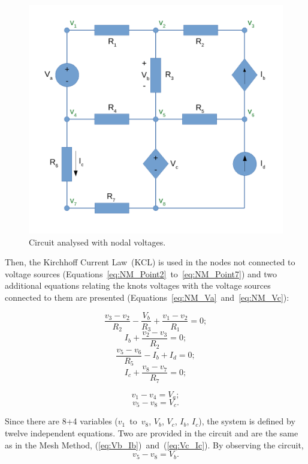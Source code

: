 \begin{figure}[h] \centering
\includegraphics[width=0.5\linewidth]{CircuitNodal.pdf}
\caption{Circuit analysed with nodal voltages.}
\label{fig:Circuit_Nodal}
\end{figure}

Then, the Kirchhoff Current Law~(KCL) is used in the nodes not connected to voltage sources (Equations~\ref{eq:NM_Point2}~to~\ref{eq:NM_Point7}) and two additional equations relating the knots voltages with the voltage sources connected to them are presented (Equations~\ref{eq:NM_Va}~and~\ref{eq:NM_Vc}):

\begin{equation}
  \frac{v_3-v_2}{R_2} - \frac{V_b}{R_3} + \frac{v_1-v_2}{R_1} = 0;
  \label{eq:NM_Point2}
\end{equation}
\begin{equation}
  I_b + \frac{v_2-v_3}{R_2} = 0;	
  \label{eq:NM_Point3}
\end{equation}
\begin{equation}
  \frac{v_5-v_6}{R_5} - I_b + I_d = 0;
  \label{eq:NM_Point6}
\end{equation}
\begin{equation}
  I_c + \frac{v_8-v_7}{R_7} = 0;
  \label{eq:NM_Point7}
\end{equation}

\begin{equation}
  v_1 - v_4 = V_a;
  \label{eq:NM_Va}
\end{equation}
\begin{equation}
  v_5 - v_8 = V_c.
  \label{eq:NM_Vc}
\end{equation}

Since there are 8+4 variables ($v_1$~to~$v_8$, $V_b$, $V_c$, $I_b$, $I_c$), the system is defined by twelve independent equations. Two are provided in the circuit and are the same as in the Mesh Method, (\ref{eq:Vb_Ib})~and~(\ref{eq:Vc_Ic}).
By observing the circuit,
\begin{equation}
  v_5 - v_8 = V_b.
  \label{eq:NM_Vb}
\end{equation}


